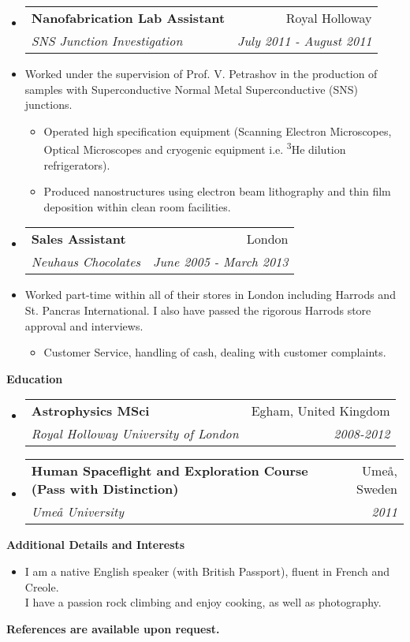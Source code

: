 \documentclass[letterpaper,11pt]{article}
\makeatletter
\newcommand{\resitem}[1]{\item #1 \vspace{-2pt}}
\newcommand{\resheading}[1]{{\large \colorbox{mygrey}
			{\begin{minipage}{\textwidth}
					{\textbf{#1 \vphantom{p\^{E}}}}
		\end{minipage}}}
	}
\newcommand{\ressubheading}[4]{
		\begin{tabular*}{180mm}{l@{\extracolsep{\fill}}r}
			\textbf{#1} & #2 \\
			\textit{#3} & \textit{#4} \\
		\end{tabular*}\vspace{-6pt}
	}
\newcommand{\resdescription}[1]{#1 \vspace{-0mm}}
\makeatother
\begin{document}
\begin{itemize}
		\item[]
			\ressubheading{Nanofabrication Lab Assistant}{Royal Holloway}{SNS Junction Investigation}{July 2011 - August 2011}
		\item[]
			\resdescription{Worked under the supervision of Prof. V. Petrashov in the production of samples with Superconductive Normal Metal Superconductive (SNS) junctions.}
			\begin{itemize}
					\resitem{Operated high specification equipment (Scanning Electron Microscopes, Optical Microscopes and cryogenic equipment i.e. \textsuperscript{3}He dilution refrigerators).}
					\resitem{Produced nanostructures using electron beam lithography and thin film deposition within clean room facilities.}
			\end{itemize}

		\item[]
			\ressubheading{Sales Assistant}{London}{Neuhaus Chocolates}{June 2005 - March 2013}
		\item[]
			\resdescription{Worked part-time within all of their stores in London including Harrods and St. Pancras International. I also have passed the rigorous Harrods store approval and interviews.}
			\begin{itemize}
					\resitem{Customer Service, handling of cash, dealing with customer complaints.}
			\end{itemize}

	\end{itemize}

	\resheading{Education}
	\begin{itemize}
		\item[]
			\ressubheading{Astrophysics MSci }{Egham, United Kingdom}{Royal Holloway University of London}{2008-2012}

		\item[]
			\ressubheading{Human Spaceflight and Exploration Course (Pass with Distinction)}{Ume\r{a}, Sweden}{Ume\r{a} University}{2011}

	\end{itemize}

	\resheading{Additional Details and Interests}
	\begin{itemize}
		\item[] I am a native English speaker (with British Passport), fluent in French and Creole.\\
			I have a passion rock climbing and enjoy cooking, as well as photography. \\
	\end{itemize}

	\textbf{References are available upon request.}

	
\end{document}
